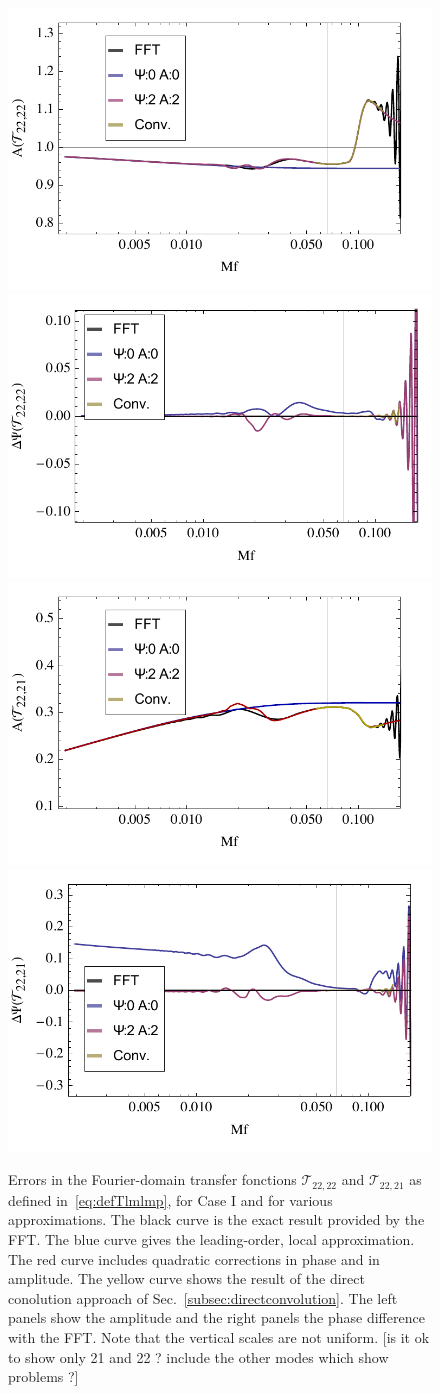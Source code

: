 \documentclass[aps,showpacs,%
prd,superscriptaddress,nofootinbib]{revtex4}
\newcommand\calT{{\mathcal{T}}}
\begin{document}
\begin{figure}
  \centering
  \includegraphics[width=.48\linewidth]{plots/precerrorA22caseI.pdf}
  \hspace{0.2cm}
  \includegraphics[width=.48\linewidth]{plots/precerrorPsi22caseI.pdf}
  \includegraphics[width=.48\linewidth]{plots/precerrorA21caseI.pdf}
  \hspace{0.2cm}
  \includegraphics[width=.48\linewidth]{plots/precerrorPsi21caseI.pdf}  
  \caption{Errors in the Fourier-domain transfer fonctions $\calT_{22,22}$ and $\calT_{22,21}$ as defined in~\eqref{eq:defTlmlmp}, for Case I and for various approximations. The black curve is the exact result provided by the FFT. The blue curve gives the leading-order, local approximation. The red curve includes quadratic corrections in phase and in amplitude. The yellow curve shows the result of the direct conolution approach of Sec.~\ref{subsec:directconvolution}. The left panels show the amplitude and the right panels the phase difference with the FFT. Note that the vertical scales are not uniform. [is it ok to show only 21 and 22 ? include the other modes which show problems ?]}
  \label{fig:precerrorcaseI}
\end{figure}
\end{document}
